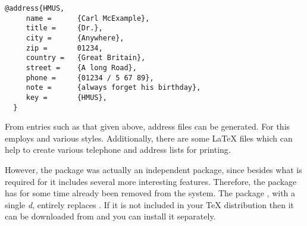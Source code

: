 \begin{lstlisting}[belowskip=\dp\strutbox,morekeywords={@address}]
  @address{HMUS,
     name =      {Carl McExample},
     title =     {Dr.},
     city =      {Anywhere},
     zip =       01234,
     country =   {Great Britain},
     street =    {A long Road},
     phone =     {01234 / 5 67 89},
     note =      {always forget his birthday},
     key =       {HMUS},
  }
\end{lstlisting}

From entries such as that given above, address files can be generated.
For this  employs {\BibTeX} and various {\BibTeX}
styles.  Additionally, there are some {\LaTeX} files which can help to
create various telephone and address lists for printing.

However, the package  was actually an independent
package, since besides what is required for {\KOMAScript} it includes
several more interesting features.  Therefore, the package
 has for some time already been removed from the
{\KOMAScript} system. The package , with a single
\emph{d}, entirely replaces .  If it is not included
in your {\TeX} distribution then it can be downloaded from
\cite{package:adrconv} and you can install it separately.

